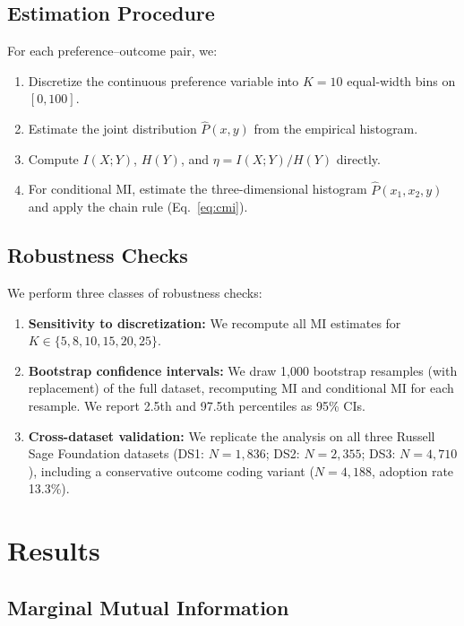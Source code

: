 \documentclass[twocolumn,10pt]{article}
\begin{document}
\subsection{Estimation Procedure}

For each preference--outcome pair, we:
\begin{enumerate}
\item Discretize the continuous preference variable into $K = 10$ equal-width bins on $[0, 100]$.
\item Estimate the joint distribution $\hat{P}(x, y)$ from the empirical histogram.
\item Compute $I(X;Y)$, $H(Y)$, and $\eta = I(X;Y)/H(Y)$ directly.
\item For conditional MI, estimate the three-dimensional histogram $\hat{P}(x_1, x_2, y)$ and apply the chain rule (Eq.~\ref{eq:cmi}).
\end{enumerate}

\subsection{Robustness Checks}

We perform three classes of robustness checks:
\begin{enumerate}
\item \textbf{Sensitivity to discretization:} We recompute all MI estimates for $K \in \{5, 8, 10, 15, 20, 25\}$.
\item \textbf{Bootstrap confidence intervals:} We draw 1,000 bootstrap resamples (with replacement) of the full dataset, recomputing MI and conditional MI for each resample.  We report 2.5th and 97.5th percentiles as 95\% CIs.
\item \textbf{Cross-dataset validation:} We replicate the analysis on all three Russell Sage Foundation datasets (DS1: $N = 1{,}836$; DS2: $N = 2{,}355$; DS3: $N = 4{,}710$), including a conservative outcome coding variant ($N = 4{,}188$, adoption rate 13.3\%).
\end{enumerate}

\section{Results}
\label{sec:results}

\subsection{Marginal Mutual Information}
\end{document}
